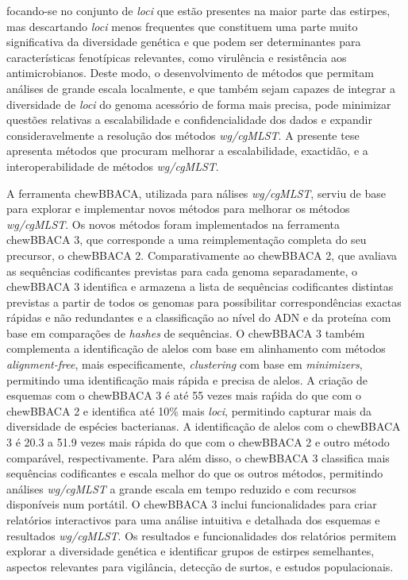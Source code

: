 focando-se no conjunto de \textit{loci} que estão presentes na maior parte das estirpes, mas descartando \textit{loci} menos frequentes que constituem uma parte muito significativa da diversidade genética e que podem ser determinantes para características fenotípicas relevantes, como virulência e resistência aos antimicrobianos. Deste modo, o desenvolvimento de métodos que permitam análises de grande escala localmente, e que também sejam capazes de integrar a diversidade de \textit{loci} do genoma acessório de forma mais precisa, pode minimizar questões relativas a escalabilidade e confidencialidade dos dados e expandir consideravelmente a resolução dos métodos \textit{wg/cgMLST}. A presente tese apresenta métodos que procuram melhorar a escalabilidade, exactidão, e a interoperabilidade de métodos \textit{wg/cgMLST}.

A ferramenta chewBBACA, utilizada para nálises \textit{wg/cgMLST}, serviu de base para explorar e implementar novos métodos para melhorar os métodos \textit{wg/cgMLST}. Os novos métodos foram implementados na ferramenta chewBBACA 3, que corresponde a uma reimplementação completa do seu precursor, o chewBBACA 2. Comparativamente ao chewBBACA 2, que avaliava as sequências codificantes previstas para cada genoma separadamente, o chewBBACA 3 identifica e armazena a lista de sequências codificantes distintas previstas a partir de todos os genomas para possibilitar correspondências exactas rápidas e não redundantes e a classificação ao nível do ADN e da proteína com base em comparações de \textit{hashes} de sequências. O chewBBACA 3 também complementa a identificação de alelos com base em alinhamento com métodos \textit{alignment-free}, mais especificamente, \textit{clustering} com base em \textit{minimizers}, permitindo uma identificação mais rápida e precisa de alelos. A criação de esquemas com o chewBBACA 3 é até 55 vezes mais raṕida do que com o chewBBACA 2 e identifica até 10\% mais \textit{loci}, permitindo capturar mais da diversidade de espécies bacterianas. A identificação de alelos com o chewBBACA 3 é 20.3 a 51.9 vezes mais rápida do que com o chewBBACA 2 e outro método comparável, respectivamente. Para além disso, o chewBBACA 3 classifica mais sequências codificantes e escala melhor do que os outros métodos, permitindo análises \textit{wg/cgMLST} a grande escala em tempo reduzido e com recursos disponíveis num portátil. O chewBBACA 3 inclui funcionalidades para criar relatórios interactivos para uma análise intuitiva e detalhada dos esquemas e resultados \textit{wg/cgMLST}. Os resultados e funcionalidades dos relatórios permitem explorar a diversidade genética e identificar grupos de estirpes semelhantes, aspectos relevantes para vigilância, detecção de surtos, e estudos populacionais.

